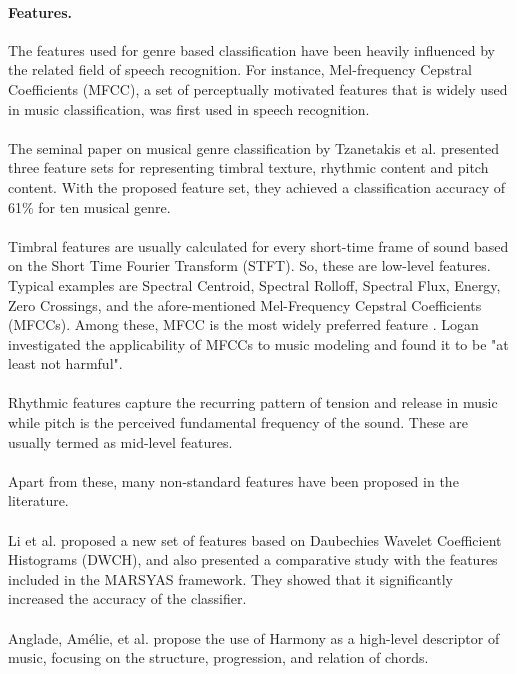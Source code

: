 {\paragraph{Features.}
The features used for genre based classification have been heavily influenced by the related field of speech recognition. 
For instance, Mel-frequency Cepstral Coefficients (MFCC), a set of perceptually motivated features that is widely used in music classification, was first used in speech recognition.\\
\\
The seminal paper on musical genre classification by Tzanetakis et al. \cite{Tzanetakis2002} presented three feature sets for representing timbral texture, rhythmic content and pitch content. 
With the proposed feature set, they achieved a classification accuracy of 61\% for ten musical genre.\\
\\
Timbral features are usually calculated for every short-time frame of sound based on the Short Time Fourier Transform (STFT). 
So, these are low-level features. 
Typical examples are Spectral Centroid, Spectral Rolloff, Spectral Flux, Energy, Zero Crossings, and the afore-mentioned Mel-Frequency Cepstral Coefficients (MFCCs).
Among these, MFCC is the most widely preferred feature \cite{Lippens2004}\cite{Kour2015}. Logan \cite{Logan2000} investigated the applicability of MFCCs to music modeling and found it to be "at least not harmful".\\
\\
Rhythmic features capture the recurring pattern of tension and release in music while pitch is the perceived fundamental frequency of the sound. 
These are usually termed as mid-level features.\\
\\
Apart from these, many non-standard features have been proposed in the literature. \\
\\
Li et al.\cite{Li2003} proposed a new set of features based on Daubechies Wavelet Coefficient Histograms (DWCH), and also presented a comparative study with the features included in the MARSYAS framework.
They showed that it significantly increased the accuracy of the classifier.\\
\\
Anglade, Amélie, et al.\cite{Anglade2010} propose the use of Harmony as a high-level descriptor of music, focusing on the structure, progression, and relation of chords.\\
\\

}
